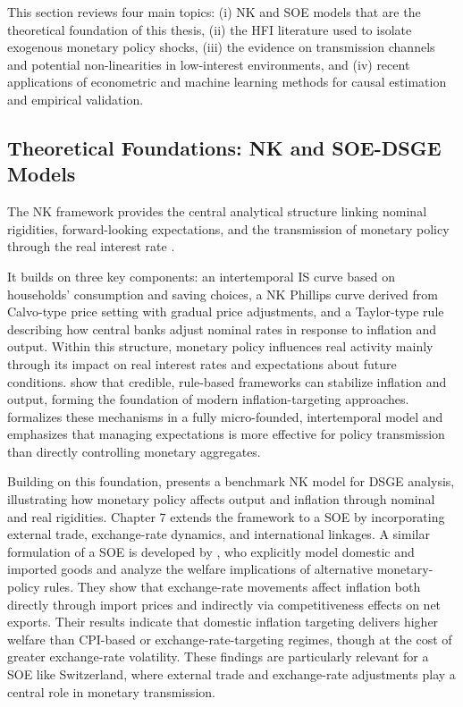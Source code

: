 \documentclass[12pt,a4paper]{article}
\begin{document}
This section reviews four main topics: (i) NK and SOE models that are the theoretical foundation of this thesis, (ii) the HFI literature used to isolate exogenous monetary policy shocks, (iii) the evidence on transmission channels and potential non-linearities in low-interest environments, and (iv) recent applications of econometric and machine learning methods for causal estimation and empirical validation.  

\subsection{Theoretical Foundations: NK and SOE-DSGE Models}

The NK framework provides the central analytical structure linking nominal rigidities, forward-looking expectations, and the transmission of monetary policy through the real interest rate \citep{clarida1999, woodford2003, gali2008}.

It builds on three key components: an intertemporal IS curve based on households’ consumption and saving choices, a NK Phillips curve derived from Calvo-type price setting with gradual price adjustments, and a Taylor-type rule describing how central banks adjust nominal rates in response to inflation and output. Within this structure, monetary policy influences real activity mainly through its impact on real interest rates and expectations about future conditions. \citet{clarida1999} show that credible, rule-based frameworks can stabilize inflation and output, forming the foundation of modern inflation-targeting approaches. \citet{woodford2003} formalizes these mechanisms in a fully micro-founded, intertemporal model and emphasizes that managing expectations is more effective for policy transmission than directly controlling monetary aggregates.

Building on this foundation, \citet{gali2008} presents a benchmark NK model for DSGE analysis, illustrating how monetary policy affects output and inflation through nominal and real rigidities. Chapter 7 extends the framework to a SOE by incorporating external trade, exchange-rate dynamics, and international linkages. A similar formulation of a SOE is developed by \citet{gali2005}, who explicitly model domestic and imported goods and analyze the welfare implications of alternative monetary-policy rules. They show that exchange-rate movements affect inflation both directly through import prices and indirectly via competitiveness effects on net exports. Their results indicate that domestic inflation targeting delivers higher welfare than CPI-based or exchange-rate-targeting regimes, though at the cost of greater exchange-rate volatility. These findings are particularly relevant for a SOE like Switzerland, where external trade and exchange-rate adjustments play a central role in monetary transmission.
\end{document}
